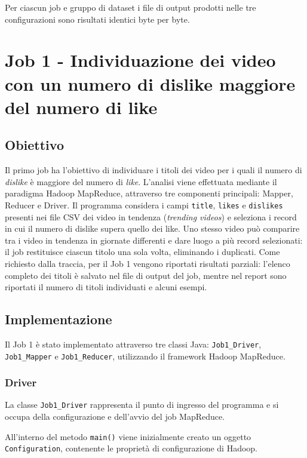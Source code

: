 \documentclass[12pt, a4paper]{article}
\begin{document}
Per ciascun job e gruppo di dataset i file di output
prodotti nelle tre configurazioni sono risultati
identici byte per byte.

\section{Job 1 - Individuazione dei video con un numero di dislike maggiore del numero di like}
\subsection{Obiettivo}
Il primo job ha l'obiettivo di individuare i titoli dei video per i quali il numero di \textit{dislike} è maggiore del numero di \textit{like}.
L'analisi viene effettuata mediante il paradigma Hadoop MapReduce, attraverso tre componenti principali: Mapper, Reducer e Driver.
Il programma considera i campi \texttt{title}, \texttt{likes} e \texttt{dislikes} presenti nei file CSV dei video in tendenza (\textit{trending videos}) e seleziona i record in cui il numero di dislike supera quello dei like.
Uno stesso video può comparire tra i video in tendenza in giornate differenti e dare luogo a più record selezionati: il job restituisce ciascun titolo una sola volta, eliminando i duplicati.
Come richiesto dalla traccia, per il Job 1 vengono riportati risultati parziali: l'elenco completo dei titoli è salvato nel file di output del job, mentre nel report sono riportati il numero di titoli individuati e alcuni esempi.

\subsection{Implementazione}

Il Job 1 è stato implementato attraverso tre classi Java:
\texttt{Job1\_Driver}, \texttt{Job1\_Mapper} e
\texttt{Job1\_Reducer}, utilizzando il framework
Hadoop MapReduce.

\subsubsection{Driver}

La classe \texttt{Job1\_Driver} rappresenta il punto
di ingresso del programma e si occupa della
configurazione e dell'avvio del job MapReduce.

All'interno del metodo \texttt{main()} viene
inizialmente creato un oggetto \texttt{Configuration},
contenente le proprietà di configurazione di Hadoop.
\end{document}
